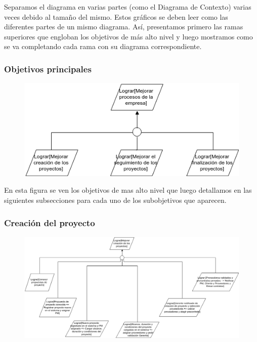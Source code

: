 Separamos el diagrama en varias partes (como el Diagrama de Contexto) varias veces debido al tamaño del mismo. Estos gráficos se deben leer como las diferentes partes de un mismo diagrama. Así, presentamos primero las ramas superiores que engloban los objetivos de más alto nivel y luego mostramos como se va completando cada rama con su diagrama correspondiente.

\subsubsection{Objetivos principales}

\begin{figure}[H]
    \centering
    \includegraphics[width=\textwidth]{imagenes/objetivos-principales.png}
\end{figure}

En esta figura se ven los objetivos de mas alto nivel que luego detallamos en las siguientes subsecciones para cada uno de los subobjetivos que aparecen.

\subsubsection{Creación del proyecto}

\begin{figure}[H]
    \centering
    \includegraphics[width=18cm, keepaspectratio]{imagenes/objetivos-creacion-principal.png}
\end{figure}

